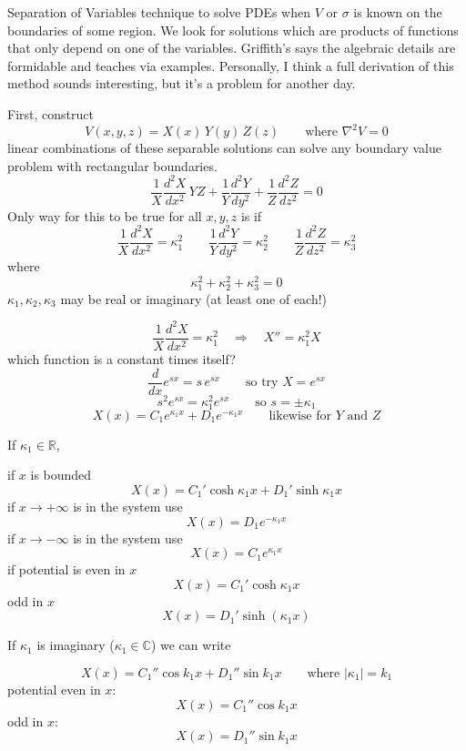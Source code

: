 \documentclass[11pt]{article}
\begin{document}
\medskip
\noindent Separation of Variables technique to solve PDEs when $V$ or $\sigma$ is known on the boundaries of some region. We look for solutions which are products of functions that only depend on one of the variables. Griffith's says the algebraic details are formidable and teaches via examples. Personally, I think a full derivation of this method sounds interesting, but it's a problem for another day.

\medskip
\noindent First, construct
\[
V(x,y,z) = X(x)\,Y(y)\,Z(z) \qquad \text{where } \nabla^{2}V = 0
\]
linear combinations of these separable solutions can solve any boundary value problem with rectangular boundaries.
\[
\frac{1}{X}\frac{d^{2}X}{dx^{2}}\,YZ + \frac{1}{Y}\frac{d^{2}Y}{dy^{2}} + \frac{1}{Z}\frac{d^{2}Z}{dz^{2}} = 0
\]
Only way for this to be true for all $x,y,z$ is if
\[
\frac{1}{X}\frac{d^{2}X}{dx^{2}} = \kappa_1^{2}
\qquad
\frac{1}{Y}\frac{d^{2}Y}{dy^{2}} = \kappa_2^{2}
\qquad
\frac{1}{Z}\frac{d^{2}Z}{dz^{2}} = \kappa_3^{2}
\]
where
\[
\kappa_1^{2} + \kappa_2^{2} + \kappa_3^{2} = 0
\]
$\kappa_1, \kappa_2, \kappa_3$ may be real or imaginary (at least one of each!)

\bigskip
\noindent
\[
\frac{1}{X}\frac{d^{2}X}{dx^{2}} = \kappa_1^{2} \quad\Rightarrow\quad X'' = \kappa_1^{2}X
\]
which function is a constant times itself?
\[
\frac{d}{dx}e^{sx} = s\,e^{sx} \qquad \text{so try } X = e^{sx}
\]
\[
s^{2}e^{sx} = \kappa_1^{2}e^{sx} \qquad \text{so } s = \pm \kappa_1
\]
\[
X(x) = C_1 e^{\kappa_1 x} + D_1 e^{-\kappa_1 x} \qquad \text{likewise for } Y \text{ and } Z
\]

\medskip
\noindent If $\kappa_1 \in \mathbb{R}$,
\begin{list}{}{\setlength{\leftmargin}{2em}\setlength{\topsep}{0pt}\setlength{\parsep}{0pt}}
\item[]
if $x$ is bounded
\[
X(x) = C_1'\cosh \kappa_1 x + D_1'\sinh \kappa_1 x
\]
if $x \to +\infty$ is in the system use
\[
X(x) = D_1 e^{-\kappa_1 x}
\]
if $x \to -\infty$ is in the system use
\[
X(x) = C_1 e^{\kappa_1 x}
\]
if potential is even in $x$
\[
X(x) = C_1'\cosh \kappa_1 x
\]
odd in $x$
\[
X(x) = D_1'\sinh(\kappa_1 x)
\]
\end{list}

\medskip
\noindent If $\kappa_1$ is imaginary ($\kappa_1 \in \mathbb{C}$) we can write
\begin{list}{}{\setlength{\leftmargin}{2em}\setlength{\topsep}{0pt}\setlength{\parsep}{0pt}}
\item[]
\[
X(x) = C_1''\cos k_1 x + D_1''\sin k_1 x \qquad \text{where } |\kappa_1| = k_1
\]
potential even in $x$:
\[
X(x) = C_1''\cos k_1 x
\]
odd in $x$:
\[
X(x) = D_1''\sin k_1 x
\]
\end{list}
\end{document}
